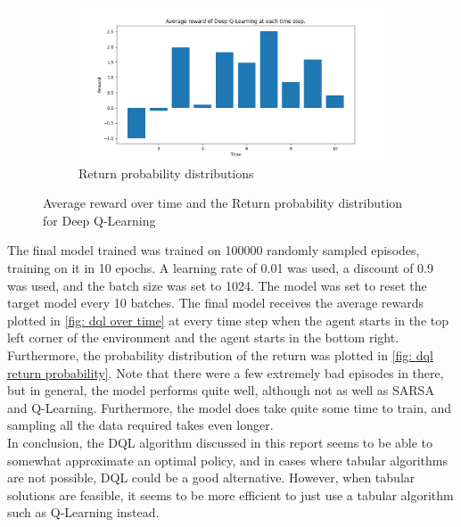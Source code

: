 \documentclass{class}
\begin{document}
\begin{appendices}
\begin{figure}[H]
\begin{subfigure}[t]{0.47\linewidth}
        \label{fig: dql over time}
    \end{subfigure}
    \begin{subfigure}[t]{0.47\linewidth}
        \centering
        \includegraphics[width=1\linewidth]{../plots/r_over_time/deep_q_learning_r_over_time.png}
        \caption{Return probability distributions}
        \label{fig: dql return probability}
    \end{subfigure}
    \caption{Average reward over time and the Return probability distribution for Deep Q-Learning}
    \label{fig: dqlstuff}
\end{figure}
\noindent The final model trained was trained on 100000 randomly sampled episodes, training on it in 10 epochs. A learning rate of 0.01 was used, a discount of 0.9 was used, and the batch size was set to 1024. The model was set to reset the target model every 10 batches. The final model receives the average rewards plotted in \autoref{fig: dql over time} at every time step when the agent starts in the top left corner of the environment and the agent starts in the bottom right. Furthermore, the probability distribution of the return was plotted in \autoref{fig: dql return probability}. Note that there were a few extremely bad episodes in there, but in general, the model performs quite well, although not as well as SARSA and Q-Learning. Furthermore, the model does take quite some time to train, and sampling all the data required takes even longer.
\\[0.3cm]
In conclusion, the DQL algorithm discussed in this report seems to be able to somewhat approximate an optimal policy, and in cases where tabular algorithms are not possible, DQL could be a good alternative. However, when tabular solutions are feasible, it seems to be more efficient to just use a tabular algorithm such as Q-Learning instead.



\end{appendices}
\end{document}
